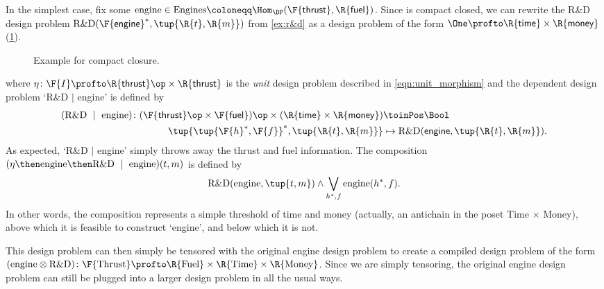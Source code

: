\begin{example}\label{ex:r&dproblem}
In the simplest case, fix some $\text{engine} \in \text{Engines} \coloneqq \Hom_\DP(\F{\mathsf{thrust}},\R{\mathsf{fuel}})$. Since \DP is compact closed, we can rewrite the R\&D design problem $\text{R\&D}(\F{\mathsf{engine}}^*, \tup{\R{t},\R{m}})$ from \cref{ex:r&d} as a design problem of the form $\One \profto \R{\mathsf{time}} \times\R{\mathsf{money}}$ (\cref{fig:excompactclosed}).

\begin{figure}[h!]
\begin{center}
\end{center}
\caption{Example for compact closure. \label{fig:excompactclosed}}
\end{figure}
where $\eta \colon \F{I} \profto \R{\mathsf{thrust}}\op \times \R{\mathsf{thrust}}$ is the \emph{unit} design problem described in \cref{eqn:unit_morphism} and the dependent design problem `R\&D $\mid$ engine' is defined by
\begin{equation}
\begin{aligned}
(\text{R\&D } \mid \text{ engine}) \colon (\F{\mathsf{thrust}}\op \times \F{\mathsf{fuel}})\op \times (\R{\mathsf{time}} \times \R{\mathsf{money}}) &\toinPos \Bool \\
\tup{\tup{\F{h}^*, \F{f}}^*, \tup{\R{t},\R{m}}} &\mapsto \text{R\&D}(\mathsf{engine}, \tup{\R{t},\R{m}}).
\end{aligned}
\end{equation}
As expected, `R\&D $|$ engine' simply throws away the thrust and fuel information. The composition $(\eta \then \text{engine} \then \text{R\&D } \mid \text{ engine}) (t,m)$ is defined by
\begin{equation}
    \text{R\&D}(\text{engine}, \tup{t,m}) \wedge \bigvee_{h^*,f} \text{engine}(h^*, f).
\end{equation}
In other words, the composition represents a simple threshold of time and money (actually, an antichain in the poset Time $\times$ Money), above which it is feasible to construct `engine', and below which it is not.

This design problem can then simply be tensored with the original engine design problem to create a compiled design problem of the form $(\text{engine} \otimes \text{R\&D}) \colon \F{\text{Thrust}} \profto \R{\text{Fuel}} \times \R{\text{Time}} \times \R{\text{Money}}$. Since we are simply tensoring, the original engine design problem can still be plugged into a larger design problem in all the usual ways.
\end{example}
